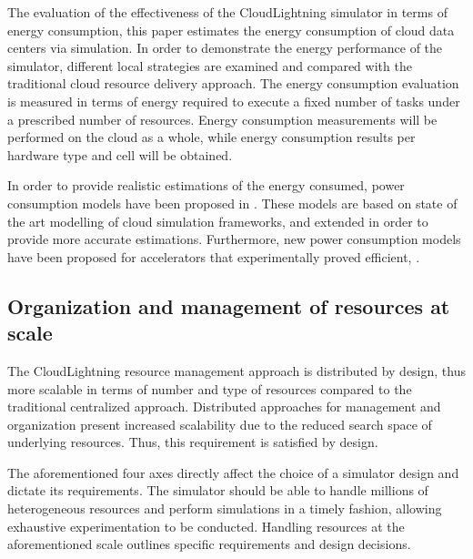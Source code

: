The evaluation of the effectiveness of the CloudLightning simulator in terms of energy consumption, this paper estimates the energy consumption of cloud data centers via simulation. In order to demonstrate the energy performance of the simulator, different local strategies are examined and compared with the traditional cloud resource delivery approach. The energy consumption evaluation is measured in terms of energy required to execute a fixed number of tasks under a prescribed number of resources. Energy consumption measurements will be performed on the cloud as a whole, while energy consumption results per hardware type and cell will be obtained.

In order to provide realistic estimations of the energy consumed, power consumption models have been proposed in \cite{cl7.1.1}. These models are based on state of the art modelling of cloud simulation frameworks, and extended in order to provide more accurate estimations. Furthermore, new power consumption models have been proposed for accelerators that experimentally proved efficient, \cite{MakaratzisGPU}.

\subsection{Organization and management of resources at scale}

The CloudLightning resource management approach is distributed by design, thus more scalable in terms of number and type of resources compared to the traditional centralized approach. Distributed approaches for management and organization present increased scalability due to the reduced search space of underlying resources. Thus, this requirement is satisfied by design.

The aforementioned four axes directly affect the choice of a simulator design and dictate its requirements. The simulator should be able to handle millions of heterogeneous resources and perform simulations in a timely fashion, allowing exhaustive experimentation to be conducted. Handling resources at the aforementioned scale outlines specific requirements and design decisions.



